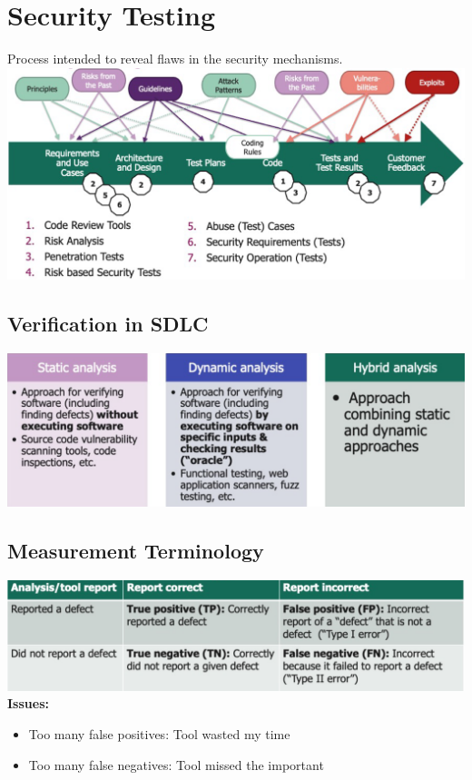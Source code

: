 
\section{Security Testing}
Process intended to reveal flaws in the security mechanisms.\\
\includegraphics[width=\linewidth]{../img/security_testing.png}

\subsection{Verification in SDLC}
\includegraphics[width=\linewidth]{../img/verification_sdlc.png}

\subsection{Measurement Terminology}
\includegraphics[width=\linewidth]{../img/measurement_terminology.png}
\textbf{Issues:}
\begin{itemize}
    \item Too many false positives: Tool wasted my time
    \item Too many false negatives: Tool missed the important
\end{itemize}

